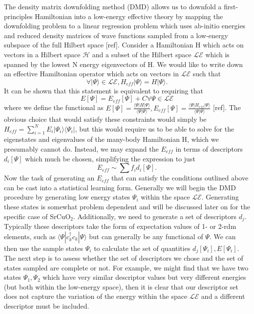 \documentclass{article}
\begin{document}
The density matrix downfolding method (DMD) allows us to downfold a first-principles Hamiltonian into a low-energy effective theory by mapping the downfolding problem to a linear regression problem which uses ab-initio energies and reduced density matrices of wave functions sampled from a low-energy subspace of the full Hilbert space [ref]. 
Consider a Hamiltonian H which acts on vectors in a Hilbert space $\mathcal{H}$ and a subset of the Hilbert space $\mathcal{LE}$ which is spanned by the lowest N energy eigenvectors of H. 
We would like to write down an effective Hamiltonian operator which acts on vectors in $\mathcal{LE}$ such that  $$\forall |\Psi\rangle \in \mathcal{LE}, H_{eff}|\Psi \rangle = H|\Psi \rangle.$$ 
It can be shown that this statement is equivalent to requiring that $$ E[\Psi] = E_{eff}[\Psi] + C \forall \Psi \in \mathcal{LE}$$ where we define the functional as $E[\Psi] = \frac{\langle \Psi | H | \Psi \rangle}{\langle \Psi | \Psi \rangle},E_{eff}[\Psi] = \frac{\langle \Psi | H_{eff} | \Psi \rangle}{\langle \Psi | \Psi \rangle}$ [ref]. 
The obvious choice that would satisfy these constraints would simply be $H_{eff} = \sum_{i=1}^{N} E_i |\Psi_i\rangle \langle \Psi_i|$, but this would require us to be able to solve for the eigenstates and eigenvalues of the many-body Hamiltonian H, which we presumably cannot do. 
Instead, we may expand the $E_{eff}$ in terms of descriptors $d_i[\Psi]$ which much be chosen, simplifying the expression to just 
\begin{equation}
E_{eff} \sim \sum f_i d_i[\Psi].
\end{equation}
Now the task of generating an $E_{eff}$ that can satisfy the conditions outlined above can be cast into a statistical learning form.
Generally we will begin the DMD procedure by generating low energy states $\Psi_i$ within the space $\mathcal{LE}$. 
Generating these states is somewhat problem dependent and will be discussed later on for the specific case of SrCuO$_2$. 
Additionally, we need to generate a set of descriptors $d_j$. 
Typically these descriptors take the form of expectation values of 1- or 2-rdm elements, such as $\langle \Psi| c^\dagger_k c_k |\Psi \rangle$ but can generally be any functional of $\Psi$. 
We can then use the sample states $\Psi_i$ to calculate the set of quantities $d_j[\Psi_i], E[\Psi_i]$. 
The next step is to assess whether the set of descriptors we chose and the set of states sampled are complete or not. 
For example, we might find that we have two states $\Psi_1, \Psi_2$ which have very similar descriptor values but very different energies (but both within the low-energy space), then it is clear that our descriptor set does not capture the variation of the energy within the space $\mathcal{LE}$ and a different descriptor must be included. 
\end{document}
